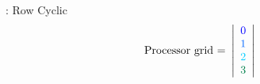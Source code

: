 \begin{frame}
\begin{exampleblock}{: Row Cyclic}
\begin{align*}
\text{Processor grid = }\left|
      \begin{array}{l}
      \color{g11}0 \\
      \color{g12}1 \\
      \color{g13}2 \\
      \color{g21}3
      \end{array}
\right| &
\end{align*}
\end{exampleblock}
\end{frame}



